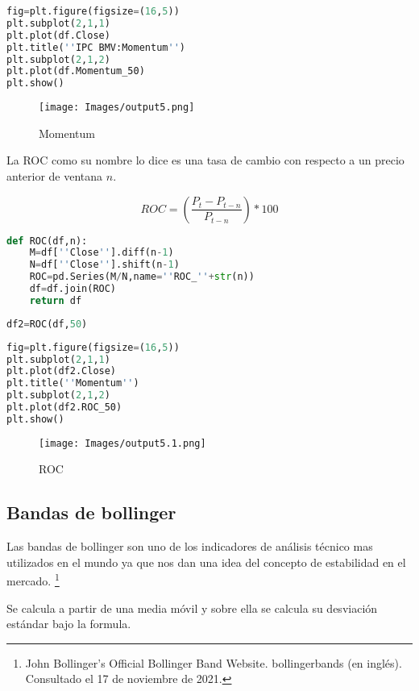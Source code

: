 \documentclass[letterpaper,12pt,oneside]{book}
\begin{document}
    
\begin{lstlisting}[language=Python]
fig=plt.figure(figsize=(16,5))
plt.subplot(2,1,1)
plt.plot(df.Close)
plt.title(''IPC BMV:Momentum'')
plt.subplot(2,1,2)
plt.plot(df.Momentum_50)
plt.show()
\end{lstlisting}


\begin{figure}[ht]
	\centering
	\texttt{[image: Images/output5.png]}
	\caption{Momentum}
	\label{fig:m6}
\end{figure}


La ROC como su nombre lo dice es una tasa de cambio con respecto a un precio anterior de ventana $n$.

\[ROC=\left ( \frac{P_{t}-P_{t-n}}{P_{t-n}} \right )*100\] 

\begin{lstlisting}[language=Python]
def ROC(df,n):
    M=df[''Close''].diff(n-1)
    N=df[''Close''].shift(n-1)
    ROC=pd.Series(M/N,name=''ROC_''+str(n))
    df=df.join(ROC)
    return df
\end{lstlisting}    
    
\begin{lstlisting}[language=Python]
df2=ROC(df,50)

\end{lstlisting}



\begin{lstlisting}[language=Python]
fig=plt.figure(figsize=(16,5))
plt.subplot(2,1,1)
plt.plot(df2.Close)
plt.title(''Momentum'')
plt.subplot(2,1,2)
plt.plot(df2.ROC_50)
plt.show()
\end{lstlisting}


\begin{figure}[ht]
	\centering
	\texttt{[image: Images/output5.1.png]}
	\caption{ROC}
	\label{fig:m7}
\end{figure}

\subsection{Bandas de bollinger}
Las bandas de bollinger son uno de los indicadores de análisis técnico mas utilizados en el mundo ya que nos dan una idea del concepto de estabilidad en el mercado. \footnote{John Bollinger's Official Bollinger Band Website. bollingerbands (en inglés). Consultado el 17 de noviembre de 2021.}

Se calcula a partir de una media móvil y sobre ella se calcula su desviación estándar bajo la formula.
\end{document}
